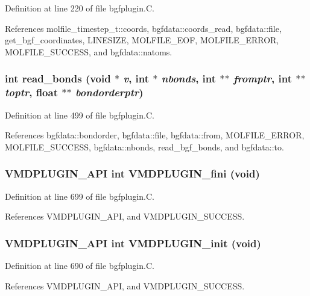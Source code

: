 Definition at line 220 of file bgfplugin.C.

References molfile\_\-timestep\_\-t::coords, bgfdata::coords\_\-read, bgfdata::file, get\_\-bgf\_\-coordinates, LINESIZE, MOLFILE\_\-EOF, MOLFILE\_\-ERROR, MOLFILE\_\-SUCCESS, and bgfdata::natoms.
\subsubsection{\setlength{\rightskip}{0pt plus 5cm}int read\_\-bonds (void $\ast$ {\em v}, int $\ast$ {\em nbonds}, int $\ast$$\ast$ {\em fromptr}, int $\ast$$\ast$ {\em toptr}, float $\ast$$\ast$ {\em bondorderptr})\hspace{0.3cm}{\tt  [static]}}\label{bgfplugin_8C_a13}




Definition at line 499 of file bgfplugin.C.

References bgfdata::bondorder, bgfdata::file, bgfdata::from, MOLFILE\_\-ERROR, MOLFILE\_\-SUCCESS, bgfdata::nbonds, read\_\-bgf\_\-bonds, and bgfdata::to.
\subsubsection{\setlength{\rightskip}{0pt plus 5cm}VMDPLUGIN\_\-API int VMDPLUGIN\_\-fini (void)}\label{bgfplugin_8C_a20}




Definition at line 699 of file bgfplugin.C.

References VMDPLUGIN\_\-API, and VMDPLUGIN\_\-SUCCESS.
\subsubsection{\setlength{\rightskip}{0pt plus 5cm}VMDPLUGIN\_\-API int VMDPLUGIN\_\-init (void)}\label{bgfplugin_8C_a18}




Definition at line 690 of file bgfplugin.C.

References VMDPLUGIN\_\-API, and VMDPLUGIN\_\-SUCCESS.
